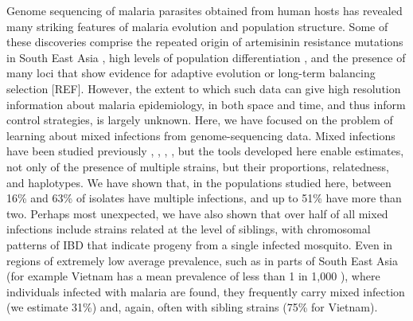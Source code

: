 \documentclass[9pt,lineno]{elife}
\begin{document}
Genome sequencing of malaria parasites obtained from human hosts has revealed many striking features of malaria evolution and population structure. Some of these discoveries comprise the repeated origin of artemisinin resistance mutations in South East Asia \citep{miotto2015genetic}, high levels of population differentiation \citep{Miotto2013}, and the presence of many loci that show evidence for adaptive evolution or long-term balancing selection [REF].  However, the extent to which such data can give high resolution information about malaria epidemiology, in both space and time, and thus inform control strategies, is largely unknown.  Here, we have focused on the problem of learning about mixed infections from genome-sequencing data.  Mixed infections have been studied previously \citep{Galinsky2015}, \citep{Jack2016}, \citep{auburn2012characterization}, \citep{assefa2014estmoi}, but the tools developed here enable estimates, not only of the presence of multiple strains, but their proportions, relatedness, and haplotypes.  We have shown that, in the populations studied here, between 16\% and 63\% of isolates have multiple infections, and up to 51\% have more than two.  Perhaps most unexpected, we have also shown that over half of all mixed infections include strains related at the level of siblings, with chromosomal patterns of IBD that indicate progeny from a single infected mosquito.  Even in regions of extremely low average prevalence, such as in parts of South East Asia (for example Vietnam has a mean prevalence of less than 1 in 1,000 \citep{who2017, who2017profile}), where individuals infected with malaria are found, they frequently carry mixed infection (we estimate 31\%) and, again, often with sibling strains (75\% for Vietnam).

\end{document}
